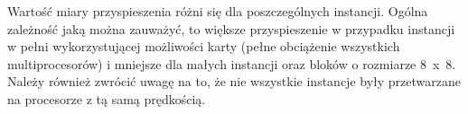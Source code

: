 \documentclass[12pt,a4paper]{article}
\begin{document}
Wartość miary przyspieszenia różni się dla poszczególnych instancji. Ogólna zależność jaką można zauważyć, to większe przyspieszenie w przypadku instancji w pełni wykorzystującej możliwości karty (pełne obciążenie wszystkich multiprocesorów) i mniejsze dla małych instancji oraz bloków o rozmiarze 8~x~8. Należy również zwrócić uwagę na to, że nie wszystkie instancje były przetwarzane na procesorze z tą samą prędkością.
\end{document}
